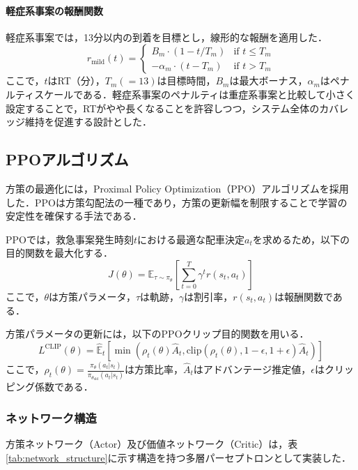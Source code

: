\paragraph{軽症系事案の報酬関数}

軽症系事案では，13分以内の到着を目標とし，線形的な報酬を適用した．
\[
r_{\text{mild}}(t) = 
\begin{cases} 
B_m \cdot (1 - t/T_m) & \text{if } t \leq T_m \\ 
-\alpha_m \cdot (t - T_m) & \text{if } t > T_m 
\end{cases}
\]
ここで，$t$はRT（分），$T_m(=13)$は目標時間，$B_m$は最大ボーナス，$\alpha_m$はペナルティスケールである．軽症系事案のペナルティは重症系事案と比較して小さく設定することで，RTがやや長くなることを許容しつつ，システム全体のカバレッジ維持を促進する設計とした．


\subsection{PPOアルゴリズム}
方策の最適化には，Proximal Policy Optimization（PPO）アルゴリズム\cite{schulman2017}\cite{Moen2024}を採用した．PPOは方策勾配法の一種であり，方策の更新幅を制限することで学習の安定性を確保する手法である．

PPOでは，救急事案発生時刻$t$における最適な配車決定$a_t$を求めるため，以下の目的関数を最大化する．
\[
J(\theta) = \mathbb{E}_{\tau \sim \pi_\theta} \left[ \sum_{t=0}^{T} \gamma^t r(s_t, a_t) \right]
\]
ここで，$\theta$は方策パラメータ，$\tau$は軌跡，$\gamma$は割引率，$r(s_t, a_t)$は報酬関数である．

方策パラメータの更新には，以下のPPOクリップ目的関数を用いる．
\[
L^{\text{CLIP}}(\theta) = \hat{\mathbb{E}}_t \left[ \min\left( \rho_t(\theta) \hat{A}_t, \text{clip}(\rho_t(\theta), 1-\epsilon, 1+\epsilon) \hat{A}_t \right) \right]
\]
ここで，$\rho_t(\theta) = \frac{\pi_\theta(a_t|s_t)}{\pi_{\theta_{\text{old}}}(a_t|s_t)}$は方策比率，$\hat{A}_t$はアドバンテージ推定値，$\epsilon$はクリッピング係数である．

\subsubsection{ネットワーク構造}
方策ネットワーク（Actor）及び価値ネットワーク（Critic）は，表\ref{tab:network_structure}に示す構造を持つ多層パーセプトロンとして実装した．

